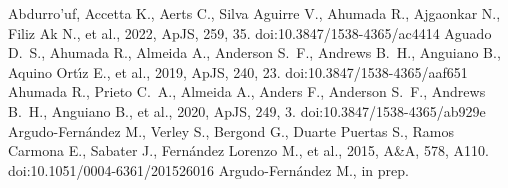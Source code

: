 \documentclass[fleqn,usenatbib]{mnras}
\begin{document}


%

\begin{thebibliography}{}


 Abdurro'uf, Accetta K., Aerts C., Silva Aguirre V., Ahumada R., Ajgaonkar N., Filiz Ak N., et al., 2022, ApJS, 259, 35. doi:10.3847/1538-4365/ac4414
 Aguado D.~S., Ahumada R., Almeida A., Anderson S.~F., Andrews B.~H., Anguiano B., Aquino Ort{\'\i}z E., et al., 2019, ApJS, 240, 23. doi:10.3847/1538-4365/aaf651
 Ahumada R., Prieto C.~A., Almeida A., Anders F., Anderson S.~F., Andrews B.~H., Anguiano B., et al., 2020, ApJS, 249, 3. doi:10.3847/1538-4365/ab929e
 Argudo-Fern{\'a}ndez M., Verley S., Bergond G., Duarte Puertas S., Ramos Carmona E., Sabater J., Fern{\'a}ndez Lorenzo M., et al., 2015, A\&A, 578, A110. doi:10.1051/0004-6361/201526016
 Argudo-Fern{\'a}ndez M., in prep.


\end{thebibliography}
\end{document}
